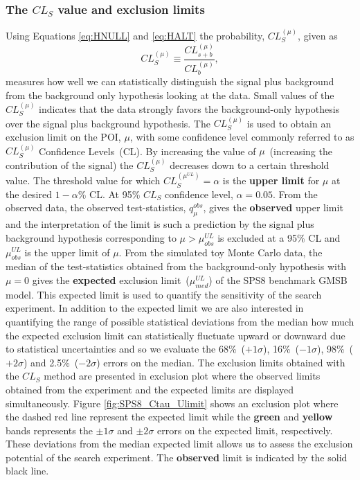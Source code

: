 \subsubsection{The $CL_{S}$ value and exclusion limits} 
Using Equations \ref{eq:HNULL} and \ref{eq:HALT} the probability, $ CL^{(\mu)}_{S}$, given as
\begin{equation}
CL^{(\mu)}_{S} \equiv \frac{CL^{(\mu)}_{s+b} }{ CL^{(\mu)}_{b}},
\end{equation}
measures how well we can statistically distinguish the signal plus background from the background only hypothesis looking at the data. Small values of the $CL^{(\mu)}_{S}$ indicates that the data strongly favors the background-only hypothesis over the signal plus background hypothesis.
\newline
The $CL^{(\mu)}_{S}$ is used to obtain an exclusion limit on the POI, $\mu$, with some confidence level commonly referred to as $CL^{(\mu)}_{S}$ Confidence Levels~(CL). By increasing the value of $\mu$~(increasing the contribution of the signal) the $CL^{(\mu)}_{S}$ decreases down to a certain threshold value. The threshold value for which $CL^{(\mu^{UL})}_{S} = \alpha$ is the \textbf{upper limit} for $\mu$ at the desired $1-\alpha$\% CL. At 95\% $CL_{S}$ confidence level, $\alpha = 0.05$. 
\newline
From the observed data, the observed test-statistics, $q^{obs}_{\mu}$, gives the \textbf{observed} upper limit and the interpretation of the limit is such a prediction by the signal plus background hypothesis corresponding to $\mu > \mu_{obs}^{UL}$ is excluded at a 95\% CL and $\mu_{obs}^{UL}$ is the upper limit of $\mu$.
\newline
From the simulated toy Monte Carlo data, the median of the test-statistics obtained from the background-only hypothesis with $\mu = 0$ gives the \textbf{expected} exclusion limit~($\mu_{med}^{UL}$) of the SPS8 benchmark GMSB model. This expected limit is used to quantify the sensitivity of the search experiment.
\newline
In addition to the expected limit we are also interested in quantifying the range of possible statistical deviations from the median \ie how much the expected exclusion limit can statistically fluctuate upward or downward due to statistical uncertainties and so we evaluate the 68\%~($+1\sigma$), 16\%~($-1\sigma$), 98\%~($+ 2\sigma$) and 2.5\%~($-2\sigma$) errors on the median. The exclusion limits obtained with the $CL_{S}$ method are presented in exclusion plot where the observed limits obtained from the experiment and the expected limits are displayed simultaneously. Figure \ref{fig:SPS8_Ctau_Ulimit} shows an exclusion plot where the dashed red line represent the expected limit while the \textbf{green} and \textbf{yellow} bands represents the $\pm1\sigma$ and $\pm2\sigma$ errors on the expected limit, respectively. These deviations from the median expected limit allows us to assess the exclusion potential of the search experiment. The \textbf{observed} limit is indicated by the solid black line.
